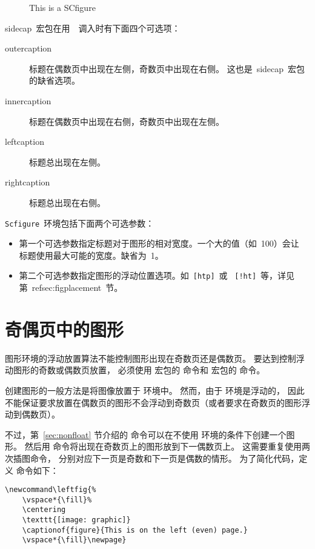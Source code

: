 \begin{SCfigure} 
	\resizebox{3in}{!}{\usebox{\graphic}}
	\caption{This is a SCfigure}
	\label{fig:sidecap}
\end{SCfigure}

\noindent\textsf{sidecap}~宏包在用~~调入时有下面四个可选项：
\begin{description}
	\item [outercaption] 标题在偶数页中出现在左侧，奇数页中出现在右侧。
	这也是~\textsf{sidecap}~宏包的缺省选项。
	\item [innercaption] 标题在偶数页中出现在右侧，奇数页中出现在左侧。
	\item [leftcaption]  标题总出现在左侧。
	\item [rightcaption] 标题总出现在右侧。
\end{description}

\noindent\texttt{Scfigure}~环境包括下面两个可选参数：
\begin{itemize}
	\item 第一个可选参数指定标题对于图形的相对宽度。一个大的值（如~100）会让
	标题使用最大可能的宽度。缺省为~1。
	\item 第二个可选参数指定图形的浮动位置选项。如~\texttt{[htp]}~或
	~\texttt{[!ht]}~等，详见第~ref{sec:figplacement}~节。
\end{itemize}

\section{奇偶页中的图形}\label{sec:evenoddpage}

图形环境的浮动放置算法不能控制图形出现在奇数页还是偶数页。
要达到控制浮动图形的奇数或偶数页放置，
必须使用  宏包的  命令和  宏包的  命令。

创建图形的一般方法是将图像放置于  环境中。
然而，由于  环境是浮动的，
因此不能保证要求放置在偶数页的图形不会浮动到奇数页（或者要求在奇数页的图形浮动到偶数页）。

不过，第~\ref{sec:nonfloat} 节介绍的  命令可以在不使用  环境的条件下创建一个图形。
然后用  命令将出现在奇数页上的图形放到下一偶数页上。
这需要重复使用两次插图命令，
分别对应下一页是奇数和下一页是偶数的情形。
为了简化代码，定义  命令如下：
\begin{lstlisting}
\newcommand\leftfig{%
	\vspace*{\fill}%
	\centering
	\texttt{[image: graphic]}
	\captionof{figure}{This is on the left (even) page.}
	\vspace*{\fill}\newpage}
\end{lstlisting}

